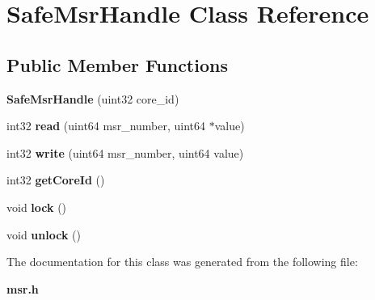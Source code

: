 \section{Safe\+Msr\+Handle Class Reference}
\label{classSafeMsrHandle}
\subsection*{Public Member Functions}
\begin{DoxyCompactItemize}
\item 
{\bfseries Safe\+Msr\+Handle} (uint32 core\+\_\+id)\label{classSafeMsrHandle_af7a62cd143e86be1ef2d2f6d5f67fc30}

\item 
int32 {\bfseries read} (uint64 msr\+\_\+number, uint64 $\ast$value)\label{classSafeMsrHandle_af2ad27203ae5d1072ad8e1ca5d988ce5}

\item 
int32 {\bfseries write} (uint64 msr\+\_\+number, uint64 value)\label{classSafeMsrHandle_a252aa9dee867d8b8f787b1de007b49a7}

\item 
int32 {\bfseries get\+Core\+Id} ()\label{classSafeMsrHandle_ae8735531f00abaaa17aac519c1e5360e}

\item 
void {\bfseries lock} ()\label{classSafeMsrHandle_a89f1431cde1d9e8ccd12c73cf6646cfd}

\item 
void {\bfseries unlock} ()\label{classSafeMsrHandle_af88c3d09575dab20ab68ce0267477e31}

\end{DoxyCompactItemize}


The documentation for this class was generated from the following file\+:\begin{DoxyCompactItemize}
\item 
{\bf msr.\+h}\end{DoxyCompactItemize}
